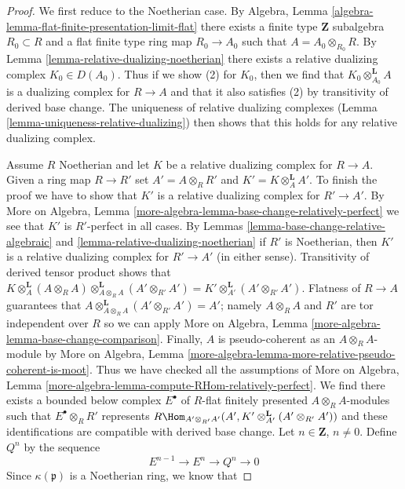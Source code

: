 \begin{proof}
We first reduce to the Noetherian case. By
Algebra, Lemma \ref{algebra-lemma-flat-finite-presentation-limit-flat}
there exists a finite type $\mathbf{Z}$ subalgebra $R_0 \subset R$
and a flat finite type ring map $R_0 \to A_0$ such that
$A = A_0 \otimes_{R_0} R$. By Lemma \ref{lemma-relative-dualizing-noetherian}
there exists a relative
dualizing complex $K_0 \in D(A_0)$.
Thus if we show (2) for $K_0$, then we find that
$K_0 \otimes_{A_0}^\mathbf{L} A$ is
a dualizing complex for $R \to A$ and that it also satisfies (2)
by transitivity of derived base change.
The uniqueness of relative dualizing complexes
(Lemma \ref{lemma-uniqueness-relative-dualizing})
then shows that this holds for
any relative dualizing complex.

\medskip\noindent
Assume $R$ Noetherian and let $K$ be a relative dualizing complex
for $R \to A$. Given a ring map $R \to R'$ set $A' = A \otimes_R R'$
and $K' = K \otimes_A^\mathbf{L} A'$. To finish the proof we have
to show that $K'$ is a relative dualizing complex for $R' \to A'$.
By More on Algebra, Lemma
\ref{more-algebra-lemma-base-change-relatively-perfect}
we see that $K'$ is $R'$-perfect in all cases.
By Lemmas \ref{lemma-base-change-relative-algebraic} and
\ref{lemma-relative-dualizing-noetherian}
if $R'$ is Noetherian, then $K'$ is a relative dualizing complex
for $R' \to A'$ (in either sense).
Transitivity of derived tensor product shows that
$K \otimes_A^\mathbf{L} (A \otimes_R A)
\otimes_{A \otimes_R A}^\mathbf{L} (A' \otimes_{R'} A') =
K' \otimes_{A'}^\mathbf{L} (A' \otimes_{R'} A')$.
Flatness of $R \to A$ guarantees that
$A \otimes_{A \otimes_R A}^\mathbf{L} (A' \otimes_{R'} A') = A'$;
namely $A \otimes_R A$ and $R'$ are tor independent over $R$
so we can apply More on Algebra, Lemma
\ref{more-algebra-lemma-base-change-comparison}.
Finally, $A$ is pseudo-coherent as an $A \otimes_R A$-module
by More on Algebra, Lemma
\ref{more-algebra-lemma-more-relative-pseudo-coherent-is-moot}. Thus
we have checked all the assumptions of
More on Algebra, Lemma
\ref{more-algebra-lemma-compute-RHom-relatively-perfect}.
We find there exists a bounded below complex
$E^\bullet$ of $R$-flat finitely presented $A \otimes_R A$-modules
such that $E^\bullet \otimes_R R'$ represents
$R\Hom_{A' \otimes_{R'} A'}(A',
K' \otimes_{A'}^\mathbf{L} (A' \otimes_{R'} A'))$
and these identifications are compatible with derived base change.
Let $n \in \mathbf{Z}$, $n \not = 0$.
Define $Q^n$ by the sequence
$$
E^{n - 1} \to E^n \to Q^n \to 0
$$
Since $\kappa(\mathfrak p)$ is a Noetherian ring, we know that

\end{proof}
